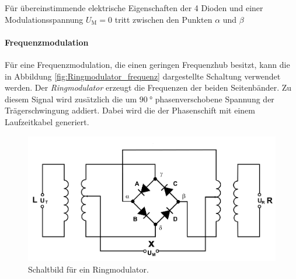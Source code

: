 Für übereinstimmende elektrische Eigenschaften
der 4 Dioden und einer Modulationsspannung $U_{\text{M}}=0$
tritt zwischen den Punkten $\alpha$ und $\beta$






\paragraph{Frequenzmodulation}
Für eine Frequenzmodulation, die einen geringen Frequenzhub besitzt,
kann die in Abbildung \ref{fig:Ringmodulator_frequenz} dargestellte
Schaltung verwendet werden.
Der \textit{Ringmodulator} erzeugt die Frequenzen der beiden Seitenbänder.
Zu diesem Signal wird zusätzlich die um $\SI{90}{\degree}$ phasenverschobene
Spannung der Trägerschwingung addiert. Dabei wird die der Phasenschift
mit einem Laufzeitkabel generiert.

\begin{figure}
  \centering
  \includegraphics{figures/Ringmodulator.PNG}
  \caption{Schaltbild für ein Ringmodulator.}
  \label{fig:Ringmodulator}
\end{figure}

